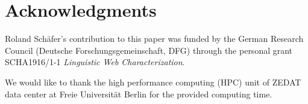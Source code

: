 \documentclass[11pt]{article}
\begin{document}
\section*{Acknowledgments}

Roland Schäfer's contribution to this paper was funded by the German Research Council (Deutsche Forschungsgemeinschaft, DFG) through the personal grant SCHA1916/1-1 \textit{Linguistic Web Characterization}.

We would like to thank the high performance computing (HPC) unit of ZEDAT data center at Freie Universität Berlin for the provided computing time.




\end{document}
